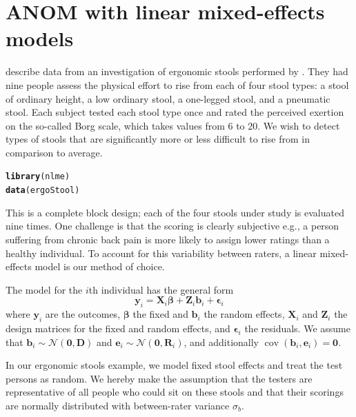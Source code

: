 \documentclass[a4paper]{article}\usepackage[]{graphicx}\usepackage[]{color}
\makeatletter
\newcommand{\hlstd}[1]{\textcolor[rgb]{0.345,0.345,0.345}{#1}}%
\newcommand{\hlkwd}[1]{\textcolor[rgb]{0.737,0.353,0.396}{\textbf{#1}}}%
\newenvironment{kframe}{%
 \def\at@end@of@kframe{}%
 \ifinner\ifhmode%
  \def\at@end@of@kframe{\end{minipage}}%
  \begin{minipage}{\columnwidth}%
 \fi\fi%
 \def\FrameCommand##1{\hskip\@totalleftmargin \hskip-\fboxsep
 \colorbox{shadecolor}{##1}\hskip-\fboxsep
     \hskip-\linewidth \hskip-\@totalleftmargin \hskip\columnwidth}%
 \MakeFramed {\advance\hsize-\width
   \@totalleftmargin\z@ \linewidth\hsize
   \@setminipage}}%
 {\par\unskip\endMakeFramed%
 \at@end@of@kframe}
\newenvironment{knitrout}{}{} %
\makeatother
\begin{document}
\section{ANOM with linear mixed-effects models}
\label{Mixed}

\citet{Pinheiro2000} describe data from an investigation of ergonomic stools performed by \citet{Wretenberg1993}. They had nine people assess the physical effort to rise from each of four stool types: a stool of ordinary height, a low ordinary stool, a one-legged stool, and a pneumatic stool. Each subject tested each stool type once and rated the perceived exertion on the so-called Borg scale, which takes values from 6 to 20. We wish to detect types of stools that are significantly more or less difficult to rise from in comparison to average.

\begin{knitrout}
\color{fgcolor}\begin{kframe}
\begin{alltt}
\hlkwd{library}\hlstd{(nlme)}
\hlkwd{data}\hlstd{(ergoStool)}
\end{alltt}
\end{kframe}
\end{knitrout}

This is a complete block design; each of the four stools under study is evaluated nine times. One challenge is that the scoring is clearly subjective e.g., a person suffering from chronic back pain is more likely to assign lower ratings than a healthy individual. To account for this variability between raters, a linear mixed-effects model is our method of choice.

The model for the $i$th individual has the general form
\begin{equation*}
\mathbf{y}_i = \mathbf{X}_i \boldsymbol{\beta} + \mathbf{Z}_i \mathbf{b}_i + \boldsymbol{\epsilon}_i
\end{equation*}
where $\mathbf{y}_i$ are the outcomes, $\boldsymbol{\beta}$ the fixed and $\mathbf{b}_i$ the random effects, $\mathbf{X}_i$ and $\mathbf{Z}_i$ the design matrices for the fixed and random effects, and $\boldsymbol{\epsilon}_i$ the residuals. We assume that $\mathbf{b}_i \sim \mathcal{N}(\mathbf{0}, \mathbf{D})$ and $\mathbf{e}_i \sim \mathcal{N}(\mathbf{0}, \mathbf{R}_i)$, and additionally $\operatorname{cov}(\mathbf{b}_i, \mathbf{e}_i) = \mathbf{0}$.

In our ergonomic stools example, we model fixed stool effects and treat the test persons as random. We hereby make the assumption that the testers are representative of all people who could sit on these stools and that their scorings are normally distributed with between-rater variance $\sigma_b$.
\end{document}
